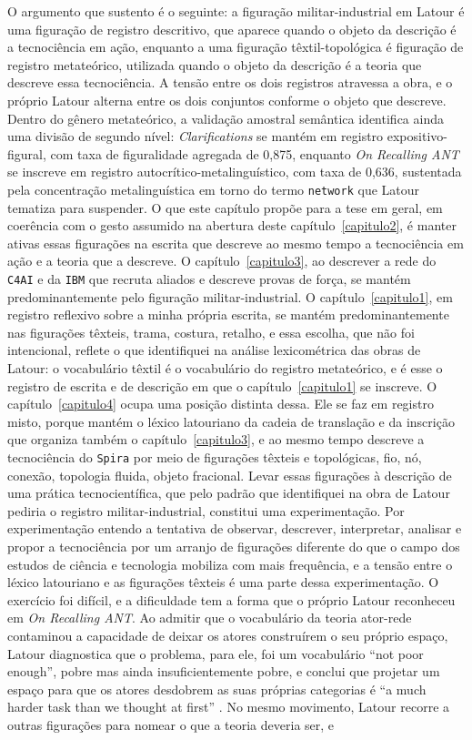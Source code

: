 O argumento que sustento é o seguinte: a figuração militar-industrial em Latour é uma figuração de registro descritivo, que aparece quando o objeto da descrição é a tecnociência em ação, enquanto a uma figuração têxtil-topológica é figuração de registro metateórico, utilizada quando o objeto da descrição é a teoria que descreve essa tecnociência. A tensão entre os dois registros atravessa a obra, e o próprio Latour alterna entre os dois conjuntos conforme o objeto que descreve. Dentro do gênero metateórico, a validação amostral semântica identifica ainda uma divisão de segundo nível: \emph{Clarifications} se mantém em registro expositivo-figural, com taxa de figuralidade agregada de 0,875, enquanto \emph{On Recalling ANT} se inscreve em registro autocrítico-metalinguístico, com taxa de 0,636, sustentada pela concentração metalinguística em torno do termo \texttt{network} que Latour tematiza para suspender. O que este capítulo propõe para a tese em geral, em coerência com o gesto assumido na abertura deste capítulo~\ref{capitulo2}, é manter ativas essas figurações na escrita que descreve ao mesmo tempo a tecnociência em ação e a teoria que a descreve. O capítulo~\ref{capitulo3}, ao descrever a rede do \texttt{C4AI} e da \texttt{IBM} que recruta aliados e descreve provas de força, se mantém predominantemente pelo figuração militar-industrial. O capítulo~\ref{capitulo1}, em registro reflexivo sobre a minha própria escrita, se mantém predominantemente nas figurações têxteis, trama, costura, retalho, e essa escolha, que não foi intencional, reflete o que identifiquei na análise lexicométrica das obras de Latour: o vocabulário têxtil é o vocabulário do registro metateórico, e é esse o registro de escrita e de descrição em que o capítulo~\ref{capitulo1} se inscreve. O capítulo~\ref{capitulo4} ocupa uma posição distinta dessa. Ele se faz em registro misto, porque mantém o léxico latouriano da cadeia de translação e da inscrição que organiza também o capítulo~\ref{capitulo3}, e ao mesmo tempo descreve a tecnociência do \texttt{Spira} por meio de figurações têxteis e topológicas, fio, nó, conexão, topologia fluida, objeto fracional. Levar essas figurações à descrição de uma prática tecnocientífica, que pelo padrão que identifiquei na obra de Latour pediria o registro militar-industrial, constitui uma experimentação. Por experimentação entendo a tentativa de observar, descrever, interpretar, analisar e propor a tecnociência por um arranjo de figurações diferente do que o campo dos estudos de ciência e tecnologia mobiliza com mais frequência, e a tensão entre o léxico latouriano e as figurações têxteis é uma parte dessa experimentação. O exercício foi difícil, e a dificuldade tem a forma que o próprio Latour reconheceu em \emph{On Recalling ANT}. Ao admitir que o vocabulário da teoria ator-rede contaminou a capacidade de deixar os atores construírem o seu próprio espaço, Latour diagnostica que o problema, para ele, foi um vocabulário \enquote{not poor enough}, pobre mas ainda insuficientemente pobre, e conclui que projetar um espaço para que os atores desdobrem as suas próprias categorias é \enquote{a much harder task than we thought at first} \parencite[p.~20--21]{Latour1999RecallingANT}. No mesmo movimento, Latour recorre a outras figurações para nomear o que a teoria deveria ser, e 